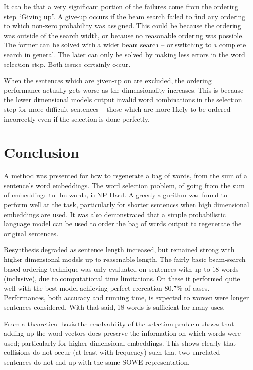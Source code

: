 \documentclass[11pt]{article}
\theoremstyle{plain}
\theoremstyle{definition}
\begin{document}
It can be that a very significant portion of the failures come from the ordering step ``Giving up''. A give-up occurs if the beam search failed to find any ordering to which non-zero probability was assigned. This could be because the ordering was outside of the search width, or because no reasonable ordering was possible. The former can be solved with a wider beam search -- or switching to a complete search in general. The later can only be solved by making less errors in the word selection step. Both issues certainly occur. 

When the sentences which are given-up on are excluded, the ordering performance actually gets worse as the dimensionality increases. This is because the lower dimensional models output invalid word combinations in the selection step for more difficult sentences -- those which are more likely to be ordered incorrectly even if the selection is done perfectly.




\section{Conclusion} \label{conclusion}
A method was presented for how to regenerate a bag of words, from the sum of a sentence's word embeddings. The word selection problem, of going from the sum of embeddings to the words, is NP-Hard. A greedy algorithm was found to perform well at the task, particularly for shorter sentences when high dimensional embeddings are used. It was also demonstrated that a simple probabilistic language model can be used to order the bag of words output to regenerate the original sentences.

Resynthesis degraded as sentence length increased, but remained strong with higher dimensional models up to reasonable length. The fairly basic beam-search based ordering technique was only evaluated on sentences with up to 18 words (inclusive), due to computational time limitations. On these it performed quite well with the best model achieving perfect recreation 80.7\% of cases. Performances, both accuracy and running time, is expected to worsen were longer sentences considered. With that said, 18 words is sufficient for many uses.

From a theoretical basis the resolvability of the selection problem shows that adding up the word vectors does preserve the information on which words were used; particularly for higher dimensional embeddings. This shows clearly that collisions do not occur (at least with frequency) such that two unrelated sentences do not end up with the same SOWE representation. 
\end{document}

